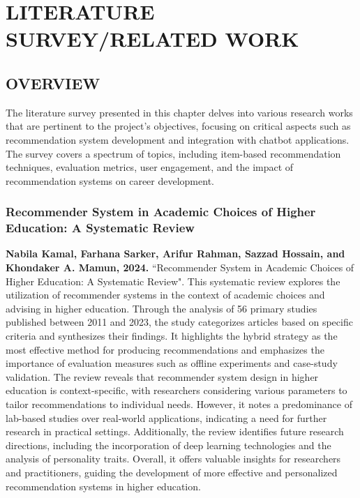 
\chapter{\uppercase{Literature Survey/Related Work}} %
\label{ch:survey} %
\section{\uppercase{Overview}}

The literature survey presented in this chapter delves into various research works that are pertinent to the project's objectives, focusing on critical aspects such as recommendation system development and integration with chatbot applications. The survey covers a spectrum of topics, including item-based recommendation techniques, evaluation metrics, user engagement, and the impact of recommendation systems on career development.

\subsection{Recommender System in Academic Choices of Higher Education: A Systematic Review}

\textbf{Nabila Kamal, Farhana Sarker, Arifur Rahman, Sazzad Hossain, and Khondaker A. Mamun, 2024.} “Recommender System in Academic Choices of Higher Education: A Systematic Review". This systematic review explores the utilization of recommender systems in the context of academic choices and advising in higher education. Through the analysis of 56 primary studies published between 2011 and 2023, the study categorizes articles based on specific criteria and synthesizes their findings. It highlights the hybrid strategy as the most effective method for producing recommendations and emphasizes the importance of evaluation measures such as offline experiments and case-study validation. The review reveals that recommender system design in higher education is context-specific, with researchers considering various parameters to tailor recommendations to individual needs. However, it notes a predominance of lab-based studies over real-world applications, indicating a need for further research in practical settings. Additionally, the review identifies future research directions, including the incorporation of deep learning technologies and the analysis of personality traits. Overall, it offers valuable insights for researchers and practitioners, guiding the development of more effective and personalized recommendation systems in higher education.


